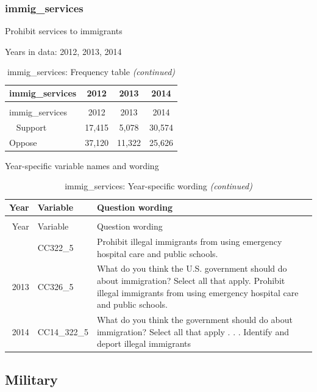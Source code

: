 \documentclass[12pt]{article}
\begin{document}
\subsubsection{immig\_services}\label{immig_services}

Prohibit services to immigrants

Years in data: 2012, 2013, 2014

\begin{longtable}[t]{lccc}
\caption{\label{tab:unnamed-chunk-4}immig\_services: Frequency table}\\
\toprule
immig\_services & 2012 & 2013 & 2014\\
\midrule
\endfirsthead
\caption[]{immig\_services: Frequency table \textit{(continued)}}\\
\toprule
immig\_services & 2012 & 2013 & 2014\\
\midrule
\endhead
\
\endfoot
\bottomrule
\endlastfoot
Support & 17,415 & 5,078 & 30,574\\
Oppose & 37,120 & 11,322 & 25,626\\*
\end{longtable}

Year-specific variable names and wording

\begin{longtable}[t]{rl>{\raggedright\arraybackslash}p{10cm}}
\caption{\label{tab:unnamed-chunk-4}immig\_services: Year-specific wording}\\
\toprule
Year & Variable & Question wording\\
\midrule
\endfirsthead
\caption[]{immig\_services: Year-specific wording \textit{(continued)}}\\
\toprule
Year & Variable & Question wording\\
\midrule
\endhead
\
\endfoot
\bottomrule
\endlastfoot
2012 & CC322\_5 & Prohibit illegal immigrants from using emergency hospital care and public schools.\\
2013 & CC326\_5 & What do you think the U.S. government should do about immigration? Select all that apply. Prohibit illegal immigrants from using emergency hospital care and public schools.\\
2014 & CC14\_322\_5 & What do you think the government should do about immigration? Select all that apply . . . Identify and deport illegal immigrants\\*
\end{longtable}\newpage

\subsection{Military}\label{military}
\end{document}
